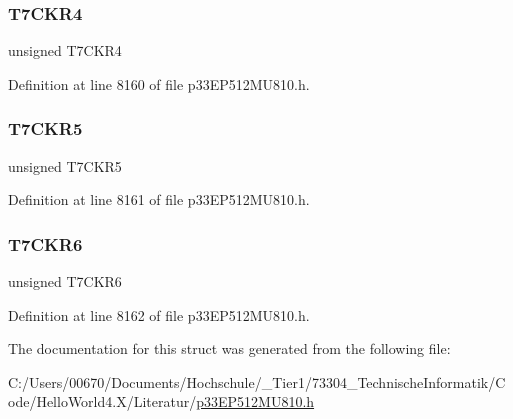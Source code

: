 \subsubsection{\texorpdfstring{T7\+C\+K\+R4}{T7CKR4}}
{\footnotesize\ttfamily unsigned T7\+C\+K\+R4}



Definition at line 8160 of file p33\+E\+P512\+M\+U810.\+h.

\mbox{\label{structtag_r_p_i_n_r5_b_i_t_s_afff0ea8c0131d68f7d41a791dd10c95e}} 
\subsubsection{\texorpdfstring{T7\+C\+K\+R5}{T7CKR5}}
{\footnotesize\ttfamily unsigned T7\+C\+K\+R5}



Definition at line 8161 of file p33\+E\+P512\+M\+U810.\+h.

\mbox{\label{structtag_r_p_i_n_r5_b_i_t_s_a5cc7bb7e1f7dd7fa365edf23854edcee}} 
\subsubsection{\texorpdfstring{T7\+C\+K\+R6}{T7CKR6}}
{\footnotesize\ttfamily unsigned T7\+C\+K\+R6}



Definition at line 8162 of file p33\+E\+P512\+M\+U810.\+h.



The documentation for this struct was generated from the following file\+:\begin{DoxyCompactItemize}
\item 
C\+:/\+Users/00670/\+Documents/\+Hochschule/\+\_\+\+Tier1/73304\+\_\+\+Technische\+Informatik/\+Code/\+Hello\+World4.\+X/\+Literatur/\hyperlink{p33_e_p512_m_u810_8h}{p33\+E\+P512\+M\+U810.\+h}\end{DoxyCompactItemize}
